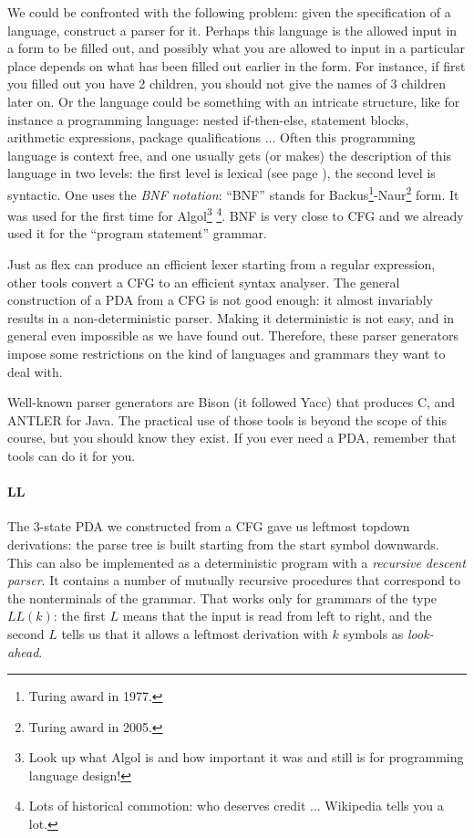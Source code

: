 We could be confronted with the following problem: given the
specification of a language, construct a parser for it. Perhaps this
language is the allowed input in a form to be filled out, and possibly
what you are allowed to input in a particular place depends on what
has been filled out earlier in the form. For instance, if first you
filled out you have 2 children, you should not give the names of 3
children later on. Or the language could be something with an
intricate structure, like for instance a programming language: nested
if-then-else, statement blocks, arithmetic expressions,
package qualifications ... Often this programming language is context
free, and one usually gets (or makes) the description of this language
in two levels: the first level is lexical (see page
\pageref{flexlabel}), the second level is syntactic. One uses the
\emph{BNF notation}: ``BNF'' stands for Backus\footnote{Turing award in
  1977.}-Naur\footnote{Turing award in 2005.} form. It was used for the
first time for Algol\footnote{Look up what Algol is and how important
  it was and still is for programming language design!} \footnote{Lots
  of historical commotion: who deserves credit ... Wikipedia tells you
  a lot.}. BNF is very close to CFG and we already used it for the ``program statement''
  grammar.

Just as flex can produce an efficient lexer starting from a regular
expression, other tools convert a CFG to an efficient syntax
analyser. The general construction of a PDA from a CFG is not good
enough: it almost invariably results in a non-deterministic parser.
Making it deterministic is not easy, and in general even impossible as
we have found out. Therefore, these parser generators impose
some restrictions on the kind of languages and grammars they want to deal
with.

Well-known parser generators are Bison (it followed Yacc) that
produces C, and ANTLER for Java. The practical use of those tools is
beyond the scope of this course, but you should know they exist. If you ever need a PDA, remember that tools can do it for
you.

\paragraph{LL}
The 3-state PDA we constructed from a CFG gave us leftmost topdown
derivations: the parse tree is built starting from the start symbol
downwards. This can also be implemented as a deterministic program with
a {\em recursive descent parser}. It contains a number of mutually
recursive procedures that correspond to the nonterminals of the
grammar. That works only for grammars of the type $LL(k)$: the
first $L$ means that the input is read from left to right, and the second $L$
tells us that it allows a leftmost derivation with $k$ symbols as
{\em look-ahead}.

